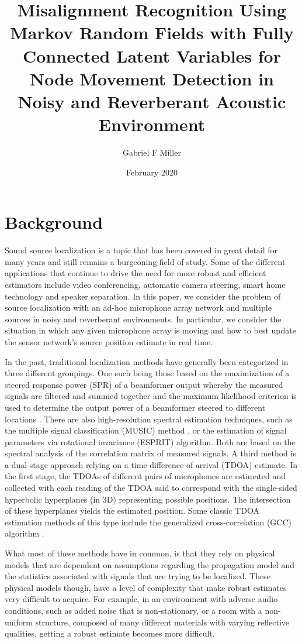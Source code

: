\documentclass{article}
\title{Misalignment Recognition Using Markov Random Fields with Fully Connected Latent Variables for Node Movement Detection in Noisy and Reverberant Acoustic Environment }
\author{Gabriel F Miller}
\date{February 2020}
\begin{document}
\maketitle

\section{Background}

Sound source localization is a topic that has been covered in great detail for many years and still remains a burgeoning field of study. Some of the different applications that continue to drive the need for more robust and efficient estimators include video conferencing, automatic camera steering, smart home technology and speaker separation. In this paper, we consider the problem of source localization with an ad-hoc microphone array network and multiple sources in noisy and reverberant environments. In particular, we consider the situation in which any given microphone array is moving and how to best update the sensor network's source position estimate in real time.

In the past, traditional localization methods have generally been categorized in three different groupings. One such being those based on the maximization of a steered response power (SPR) of a beamformer output whereby the measured signals are  filtered and summed together and the maximum likelihood criterion is used to determine the output power of a beamformer steered to different locations \cite{ROS_multipleEmitterLocation}. There are also high-resolution spectral estimation techniques, such as the multiple signal classification (MUSIC) method \cite{KY_music}, or the estimation of signal parameters via rotational invariance (ESPRIT) \cite{RR_esprit} algorithm. Both are based on the spectral analysis of the correlation matrix of measured signals. A third method is a dual-stage approach relying on a time difference of arrival (TDOA) estimate. In the first stage, the TDOAs of different pairs of microphones are estimated and collected with each reading of the TDOA said to correspond with the single-sided hyperbolic hyperplanes (in 3D) representing possible positions. The intersection of these hyperplanes yields the estimated position. Some classic TDOA estimation methods of this type include the generalized cross-correlation (GCC) algorithm \cite{CK_generalizedCorrelationMethodforTimeDelay}. 

What most of these methods have in common, is that they rely on physical models that are dependent on assumptions regarding the propagation model and the statistics associated with signals that are trying to be localized. These physical models though, have a level of complexity that make robust estimates very difficult to acquire. For example, in an  environment with adverse audio conditions, such as added noise that is non-stationary, or a room with a non-uniform structure, composed of many different materials with varying reflective qualities, getting a robust estimate becomes more difficult.
\end{document}
